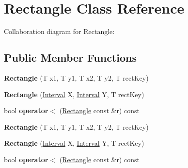 \hypertarget{classRectangle}{}\section{Rectangle Class Reference}
\label{classRectangle}


Collaboration diagram for Rectangle\+:
\subsection*{Public Member Functions}
\begin{DoxyCompactItemize}
\item 
\mbox{\label{classRectangle_a89e9aae7ebf4a328e6d2aef0eb5c4129}} 
{\bfseries Rectangle} (T x1, T y1, T x2, T y2, T rect\+Key)
\item 
\mbox{\label{classRectangle_a48ebf376f386e9d424ac54e203c5a9db}} 
{\bfseries Rectangle} (\hyperlink{classInterval}{Interval} X, \hyperlink{classInterval}{Interval} Y, T rect\+Key)
\item 
\mbox{\label{classRectangle_ae8a10f9500dab913ee2ed41ab5f6ebe5}} 
bool {\bfseries operator$<$} (\hyperlink{classRectangle}{Rectangle} const \&r) const
\item 
\mbox{\label{classRectangle_a89e9aae7ebf4a328e6d2aef0eb5c4129}} 
{\bfseries Rectangle} (T x1, T y1, T x2, T y2, T rect\+Key)
\item 
\mbox{\label{classRectangle_a48ebf376f386e9d424ac54e203c5a9db}} 
{\bfseries Rectangle} (\hyperlink{classInterval}{Interval} X, \hyperlink{classInterval}{Interval} Y, T rect\+Key)
\item 
\mbox{\label{classRectangle_ae8a10f9500dab913ee2ed41ab5f6ebe5}} 
bool {\bfseries operator$<$} (\hyperlink{classRectangle}{Rectangle} const \&r) const
\end{DoxyCompactItemize}

